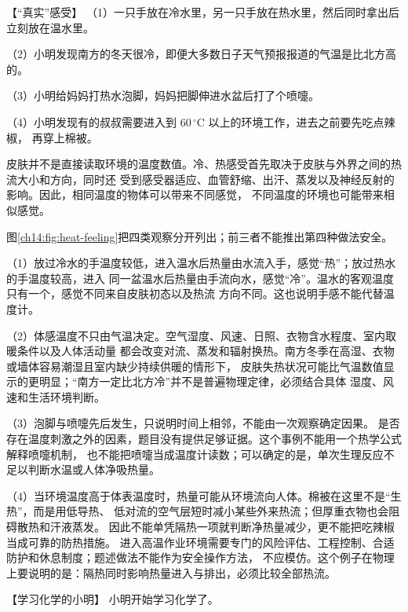 {\begin{origexamplebox}{【“真实”感受】}
（1）一只手放在冷水里，另一只手放在热水里，然后同时拿出后立刻放在温水里。

（2）小明发现南方的冬天很冷，即便大多数日子天气预报报道的气温是比北方高的。

（3）小明给妈妈打热水泡脚，妈妈把脚伸进水盆后打了个喷嚏。

（4）小明发现有的叔叔需要进入到 $60\,{}^\circ\mathrm C$ 以上的环境工作，进去之前要先吃点辣椒，
再穿上棉被。

\ThQSensation
\end{origexamplebox}

\begin{xesolution}
皮肤并不是直接读取环境的温度数值。冷、热感受首先取决于皮肤与外界之间的热流大小和方向，同时还
受到感受器适应、血管舒缩、出汗、蒸发以及神经反射的影响。因此，相同温度的物体可以带来不同感觉，
不同温度的环境也可能带来相似感觉。

图\ref{ch14:fig:heat-feeling}把四类观察分开列出；前三者不能推出第四种做法安全。
\heatFeelingDiagram

（1）放过冷水的手温度较低，进入温水后热量由水流入手，感觉“热”；放过热水的手温度较高，进入
同一盆温水后热量由手流向水，感觉“冷”。温水的客观温度只有一个，感觉不同来自皮肤初态以及热流
方向不同。这也说明手感不能代替温度计。

（2）体感温度不只由气温决定。空气湿度、风速、日照、衣物含水程度、室内取暖条件以及人体活动量
都会改变对流、蒸发和辐射换热。南方冬季在高湿、衣物或墙体容易潮湿且室内缺少持续供暖的情形下，
皮肤失热状况可能比气温数值显示的更明显；“南方一定比北方冷”并不是普遍物理定律，必须结合具体
湿度、风速和生活环境判断。

（3）泡脚与喷嚏先后发生，只说明时间上相邻，不能由一次观察确定因果。
是否存在温度刺激之外的因素，题目没有提供足够证据。这个事例不能用一个热学公式解释喷嚏机制，
也不能把喷嚏当成温度计读数；可以确定的是，单次生理反应不足以判断水温或人体净吸热量。

（4）当环境温度高于体表温度时，热量可能从环境流向人体。棉被在这里不是“生热”，而是用低导热、
低对流的空气层短时减小某些外来热流；但厚重衣物也会阻碍散热和汗液蒸发。
因此不能单凭隔热一项就判断净热量减少，更不能把吃辣椒当成可靠的防热措施。
进入高温作业环境需要专门的风险评估、工程控制、合适防护和休息制度；题述做法不能作为安全操作方法，
不应模仿。这个例子在物理上要说明的是：隔热同时影响热量进入与排出，必须比较全部热流。
\end{xesolution}

\begin{origexamplebox}{【学习化学的小明】}\label{ch14:ex:s28-19-3}
小明开始学习化学了。


\end{origexamplebox}}

